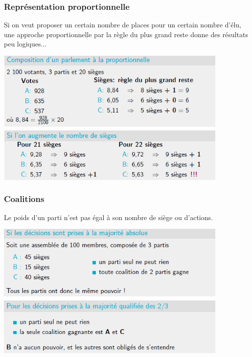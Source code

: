 \documentclass[a4paper, 12pt]{article}
\newcommand{\alinea}{
\hspace*{0.5cm}}
\begin{document}
		\subsubsection{Représentation proportionnelle}
			\alinea Si on veut proposer un certain nombre de places pour un certain nombre d'élu, une approche proportionnelle
				par la règle du plus grand reste donne des résultats peu logiques...
			\begin{center}
				\includegraphics[width=4.5in]{Images/proportions}
			\end{center}
		\subsubsection{Coalitions}
			\alinea Le poids d'un parti n'est pas égal à son nombre de siège ou d'actions. 
			\begin{center}
				\includegraphics[width=4.5in]{Images/coalitions}
			\end{center}
\end{document}
